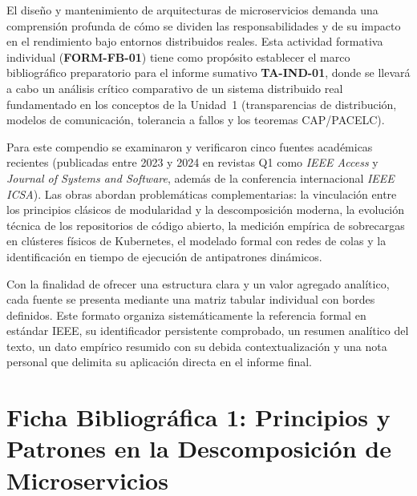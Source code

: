 \documentclass[11pt,a4paper]{article}
\begin{document}
El diseño y mantenimiento de arquitecturas de microservicios demanda una comprensión profunda de cómo se dividen las responsabilidades y de su impacto en el rendimiento bajo entornos distribuidos reales. Esta actividad formativa individual (\textbf{FORM-FB-01}) tiene como propósito establecer el marco bibliográfico preparatorio para el informe sumativo \textbf{TA-IND-01}, donde se llevará a cabo un análisis crítico comparativo de un sistema distribuido real fundamentado en los conceptos de la Unidad~1 (transparencias de distribución, modelos de comunicación, tolerancia a fallos y los teoremas CAP/PACELC).

Para este compendio se examinaron y verificaron cinco fuentes académicas recientes (publicadas entre 2023 y 2024 en revistas Q1 como \emph{IEEE Access} y \emph{Journal of Systems and Software}, además de la conferencia internacional \emph{IEEE ICSA}). Las obras abordan problemáticas complementarias: la vinculación entre los principios clásicos de modularidad y la descomposición moderna, la evolución técnica de los repositorios de código abierto, la medición empírica de sobrecargas en clústeres físicos de Kubernetes, el modelado formal con redes de colas y la identificación en tiempo de ejecución de antipatrones dinámicos.

Con la finalidad de ofrecer una estructura clara y un valor agregado analítico, cada fuente se presenta mediante una matriz tabular individual con bordes definidos. Este formato organiza sistemáticamente la referencia formal en estándar IEEE, su identificador persistente comprobado, un resumen analítico del texto, un dato empírico resumido con su debida contextualización y una nota personal que delimita su aplicación directa en el informe final.

\newpage

\section{Ficha Bibliográfica 1: Principios y Patrones en la Descomposición de Microservicios}
\end{document}
